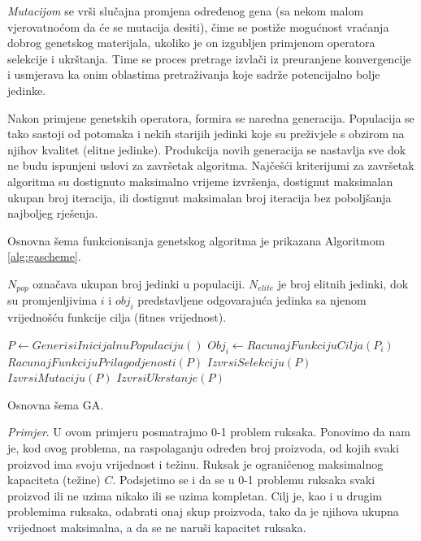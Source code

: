 \documentclass[a4paper, utf8, 11pt, colorlinks]{book}
\begin{document}
\emph{Mutacijom} se vrši slučajna promjena određenog gena (sa nekom malom vjerovatnoćom da će se mutacija desiti), čime se postiže mogućnost vraćanja dobrog genetskog materijala, ukoliko je on izgubljen primjenom operatora selekcije i ukrštanja. Time se proces pretrage izvlači iz preuranjene konvergencije i usmjerava ka onim oblastima pretraživanja koje sadrže potencijalno bolje jedinke.


Nakon primjene genetskih operatora, formira se naredna generacija. Populacija se tako sastoji od potomaka i nekih starijih jedinki koje su preživjele s obzirom na njihov kvalitet (elitne jedinke). Produkcija novih generacija se nastavlja sve dok ne budu ispunjeni uslovi za završetak algoritma. Najčešći kriterijumi za završetak algoritma su dostignuto maksimalno vrijeme izvršenja, dostignut  maksimalan ukupan broj iteracija, ili dostignut maksimalan broj iteracija bez poboljšanja najboljeg rješenja.

Osnovna šema funkcionisanja genetskog algoritma je prikazana Algoritmom \ref{alg:gascheme}.

$N_{pop}$ označava ukupan broj jedinki u populaciji.  $N_{elite}$ je broj elitnih jedinki, dok su promjenljivima  $i$ i $obj_{i}$ predstavljene odgovarajuća jedinka sa njenom vrijednošću funkcije cilja (fitnes vrijednost).

\begin{algorithm}
	\begin{algorithmic}[1]
		 \STATE  $ P \gets GenerisiInicijalnuPopulaciju()$
		            \STATE $Obj_i \gets RacunajFunkcijuCilja(P_i)$
		       \ENDFOR
		       \STATE $RacunajFunkcijuPrilagodjenosti(P)$
		       \STATE $IzvrsiSelekciju(P)$
		       \STATE $IzvrsiMutaciju(P)$
		       \STATE $IzvrsiUkrstanje(P)$
		 \ENDWHILE
	\end{algorithmic}
    \caption{Osnovna šema GA.}
    \label{alg:gascheme}
\end{algorithm}



\emph{Primjer}. U ovom primjeru posmatrajmo 0-1 problem ruksaka. Ponovimo da nam je, kod ovog problema, na raspolaganju određen broj proizvoda, od kojih svaki proizvod ima svoju vrijednost i težinu. Ruksak je ograničenog maksimalnog kapaciteta (težine) $C$. Podsjetimo se i da se u 0-1 problemu ruksaka svaki proizvod ili ne uzima nikako ili se uzima kompletan. Cilj je, kao i u drugim problemima ruksaka, odabrati onaj skup proizvoda, tako da je njihova ukupna vrijednost maksimalna, a da se ne naruši kapacitet ruksaka.
\end{document}
